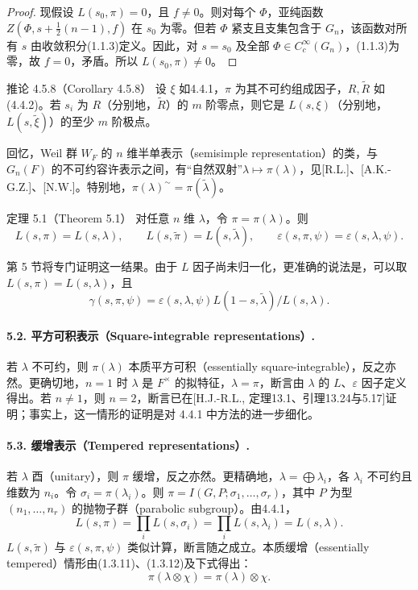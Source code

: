 \begin{proof}
现假设 $L(s_0,\pi)=0$，且 $f\ne0$。则对每个 $\Phi$，亚纯函数 $Z(\Phi,s+\tfrac12(n-1),f)$ 在 $s_0$ 为零。但若 $\Phi$ 紧支且支集包含于 $G_n$，该函数对所有 $s$ 由收敛积分(1.1.3)定义。因此，对 $s=s_0$ 及全部 $\Phi\in C_c^\infty(G_n)$，(1.1.3)为零，故 $f=0$，矛盾。所以 $L(s_0,\pi)\ne0$。
\end{proof}

\begin{originaltheorem}{推论 4.5.8（Corollary 4.5.8）}
设 $\xi$ 如4.4.1，$\pi$ 为其不可约组成因子，$R,\widetilde R$ 如(4.4.2)。若 $s_i$ 为 $R$（分别地，$\widetilde R$）的 $m$ 阶零点，则它是 $L(s,\xi)$（分别地，$L(s,\widetilde\xi)$）的至少 $m$ 阶极点。
\end{originaltheorem}

回忆，Weil 群 $W_F$ 的 $n$ 维半单表示（semisimple representation）的类，与 $G_n(F)$ 的不可约容许表示之间，有“自然双射”$\lambda\mapsto\pi(\lambda)$，见[R.L.]、[A.K.-G.Z.]、[N.W.]。特别地，$\pi(\lambda)^\sim=\pi(\widetilde\lambda)$。

\begin{originaltheorem}{定理 5.1（Theorem 5.1）}
对任意 $n$ 维 $\lambda$，令 $\pi=\pi(\lambda)$。则
\[
 L(s,\pi)=L(s,\lambda),\qquad
 L(s,\widetilde\pi)=L(s,\widetilde\lambda),\qquad
 \varepsilon(s,\pi,\psi)=\varepsilon(s,\lambda,\psi).
\]
\end{originaltheorem}
第 5 节将专门证明这一结果。由于 $L$ 因子尚未归一化，更准确的说法是，可以取 $L(s,\pi)=L(s,\lambda)$，且
\[
 \gamma(s,\pi,\psi)=\varepsilon(s,\lambda,\psi)
 L(1-s,\widetilde\lambda)/L(s,\lambda).
\]

\paragraph*{5.2. 平方可积表示（Square-integrable representations）.}
若 $\lambda$ 不可约，则 $\pi(\lambda)$ 本质平方可积（essentially square-integrable），反之亦然。更确切地，$n=1$ 时 $\lambda$ 是 $F^\times$ 的拟特征，$\lambda=\pi$，断言由 $\lambda$ 的 $L$、$\varepsilon$ 因子定义得出。若 $n\ne1$，则 $n=2$，断言已在[H.J.-R.L., 定理13.1、引理13.24与5.17]证明；事实上，这一情形的证明是对 4.4.1 中方法的进一步细化。

\paragraph*{5.3. 缓增表示（Tempered representations）.}
若 $\lambda$ 酉（unitary），则 $\pi$ 缓增，反之亦然。更精确地，$\lambda=\bigoplus\lambda_i$，各 $\lambda_i$ 不可约且维数为 $n_i$。令 $\sigma_i=\pi(\lambda_i)$。则
$\pi=I(G,P;\sigma_1,\ldots,\sigma_r)$，其中 $P$ 为型 $(n_1,\ldots,n_r)$ 的抛物子群（parabolic subgroup）。由4.4.1，
\[
 L(s,\pi)=\prod_iL(s,\sigma_i)=\prod_iL(s,\lambda_i)=L(s,\lambda).\tag{5.3.1}
\]
$L(s,\widetilde\pi)$ 与 $\varepsilon(s,\pi,\psi)$ 类似计算，断言随之成立。本质缓增（essentially tempered）情形由(1.3.11)、(1.3.12)及下式得出：
\[
 \pi(\lambda\otimes\chi)=\pi(\lambda)\otimes\chi.\tag{5.3.2}
\]
